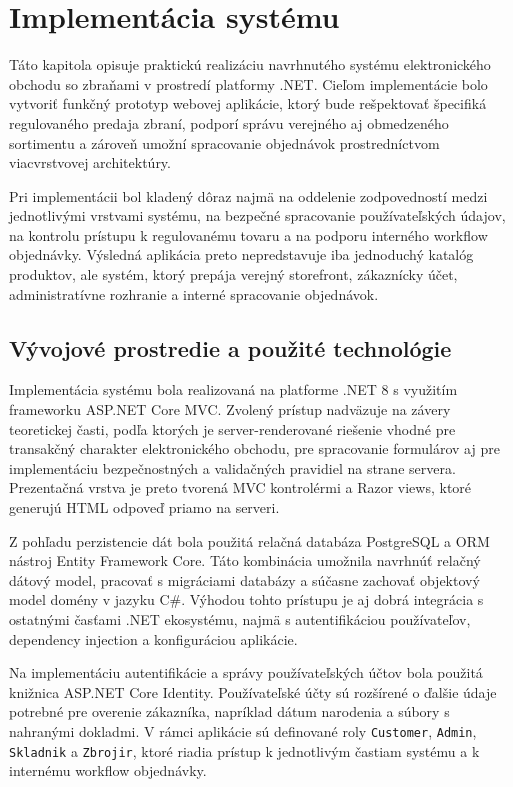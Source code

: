 \chapter{Implementácia systému}
\label{chap:implementation}

Táto kapitola opisuje praktickú realizáciu navrhnutého systému elektronického obchodu so zbraňami v prostredí platformy .NET. Cieľom implementácie bolo vytvoriť funkčný prototyp webovej aplikácie, ktorý bude rešpektovať špecifiká regulovaného predaja zbraní, podporí správu verejného aj obmedzeného sortimentu a zároveň umožní spracovanie objednávok prostredníctvom viacvrstvovej architektúry.

Pri implementácii bol kladený dôraz najmä na oddelenie zodpovedností medzi jednotlivými vrstvami systému, na bezpečné spracovanie používateľských údajov, na kontrolu prístupu k regulovanému tovaru a na podporu interného workflow objednávky. Výsledná aplikácia preto nepredstavuje iba jednoduchý katalóg produktov, ale systém, ktorý prepája verejný storefront, zákaznícky účet, administratívne rozhranie a interné spracovanie objednávok.

\section{Vývojové prostredie a použité technológie}
\label{sec:implementation-environment}

Implementácia systému bola realizovaná na platforme .NET 8 s využitím frameworku ASP.NET Core MVC. Zvolený prístup nadväzuje na závery teoretickej časti, podľa ktorých je server-renderované riešenie vhodné pre transakčný charakter elektronického obchodu, pre spracovanie formulárov aj pre implementáciu bezpečnostných a validačných pravidiel na strane servera. Prezentačná vrstva je preto tvorená MVC kontrolérmi a Razor views, ktoré generujú HTML odpoveď priamo na serveri.

Z pohľadu perzistencie dát bola použitá relačná databáza PostgreSQL a ORM nástroj Entity Framework Core. Táto kombinácia umožnila navrhnúť relačný dátový model, pracovať s migráciami databázy a súčasne zachovať objektový model domény v jazyku C\#. Výhodou tohto prístupu je aj dobrá integrácia s ostatnými časťami .NET ekosystému, najmä s autentifikáciou používateľov, dependency injection a konfiguráciou aplikácie.

Na implementáciu autentifikácie a správy používateľských účtov bola použitá knižnica ASP.NET Core Identity. Používateľské účty sú rozšírené o ďalšie údaje potrebné pre overenie zákazníka, napríklad dátum narodenia a súbory s nahranými dokladmi. V rámci aplikácie sú definované roly \texttt{Customer}, \texttt{Admin}, \texttt{Skladnik} a \texttt{Zbrojir}, ktoré riadia prístup k jednotlivým častiam systému a k internému workflow objednávky.

